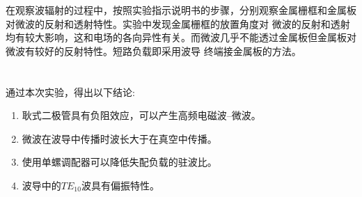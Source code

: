 ﻿\documentclass[10.5pt]{ctexart}
\begin{document}
在观察波辐射的过程中，按照实验指示说明书的步骤，分别观察金属栅框和金属板对微波的反射和透射特性。实验中发现金属栅框的放置角度对
微波的反射和透射均有较大影响，这和电场的各向异性有关。而微波几乎不能透过金属板但金属板对微波有较好的反射特性。短路负载即采用波导
终端接金属板的方法。

\section{\textbf{}}

通过本次实验，得出以下结论:
\begin{enumerate}
\item 耿式二极管具有负阻效应，可以产生高频电磁波--微波。
\item 微波在波导中传播时波长大于在真空中传播。
\item 使用单螺调配器可以降低失配负载的驻波比。
\item 波导中的$TE_{10}$波具有偏振特性。
\end{enumerate}
\end{document}
